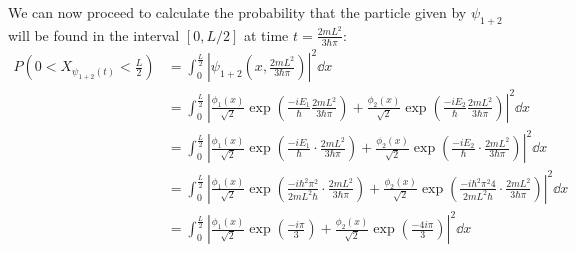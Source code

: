 \documentclass{article}
\begin{document}
We can now proceed to calculate the probability that the particle given by $\psi_{1+2}$ will be found in the interval $[0,L/2]$ at time $t=\frac{2mL^2}{3\hbar\pi}$:
\begin{align*}
    P\left(0<X_{\psi_{1+2}(t)}<\frac{L}{2}\right)&=\int_0^{\frac{L}{2}}\left|\psi_{1+2}\left(x,\frac{2mL^2}{3\hbar\pi}\right)\right|^2\dd{x}\tag{Born rule}\\
    &=\int_0^{\frac{L}{2}}\left|\frac{\phi_1(x)}{\sqrt{2}}\exp\left(\frac{-iE_1}{\hbar}\frac{2mL^2}{3\hbar\pi}\right)+\frac{\phi_2(x)}{\sqrt{2}}\exp\left(\frac{-iE_2}{\hbar}\frac{2mL^2}{3\hbar\pi}\right)\right|^2\dd{x}\\
    &=\int_0^{\frac{L}{2}}\left|\frac{\phi_1(x)}{\sqrt{2}}\exp\left(\frac{-iE_1}{\hbar}\cdot\frac{2mL^2}{3\hbar\pi}\right)+\frac{\phi_2(x)}{\sqrt{2}}\exp\left(\frac{-iE_2}{\hbar}\cdot\frac{2mL^2}{3\hbar\pi}\right)\right|^2\dd{x}\\
    &=\int_0^{\frac{L}{2}}\left|\frac{\phi_1(x)}{\sqrt{2}}\exp\left(\frac{-i\hbar^2\pi^2}{2mL^2\hbar}\cdot\frac{2mL^2}{3\hbar\pi}\right)+\frac{\phi_2(x)}{\sqrt{2}}\exp\left(\frac{-i\hbar^2\pi^2 4}{2mL^2\hbar}\cdot\frac{2mL^2}{3\hbar\pi}\right)\right|^2\dd{x}\\
    &=\int_0^{\frac{L}{2}}\left|\frac{\phi_1(x)}{\sqrt{2}}\exp\left(\frac{-i\pi}{3}\right)+\frac{\phi_2(x)}{\sqrt{2}}\exp\left(\frac{-4i\pi}{3}\right)\right|^2\dd{x}\\

\end{align*}
\end{document}
